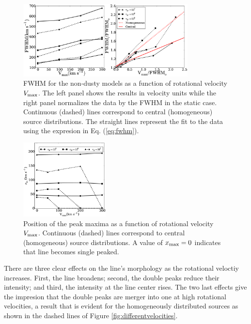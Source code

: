 \documentclass{emulateapj}
\begin{document}
\begin{figure}
\begin{center}
  \includegraphics[width=0.8\textwidth]{f2.eps}
\end{center}
  \caption{FWHM for the non-dusty models as a function of
    rotational velocity $V_{\rm max}$. The left panel shows the
    results in velocity units while the right panel normalizes
    the data by the FWHM in the static case. 
    Continuous (dashed) lines  correspond to central (homogeneous)
    source distributions. The straight lines represent the fit to
    the data using the expresion in Eq. (\ref{eq:fwhm}).
    \label{fig:widthvsvelocity}} 
\end{figure}


\begin{figure}
\begin{center}
  \includegraphics[width=0.40\textwidth]{f3.eps}
\end{center}
\caption{Position of the peak maxima as a function of rotational
  velocity $V_{\rm max}$. Continuous (dashed) lines correspond to
  central (homogeneous) source distributions. A value of $x_{\rm
    max}=0$ indicates that line becomes single
  peaked. \label{fig:maximumsvsvelocity}}  
\end{figure}

There are three clear effects on the line's morphology as the
rotational veloctiy increases. First, the line
broadens; second, the double peaks reduce their intensity; and third,
the intensity at the line center rises. The two last effects give the
impresion that the double peaks are merger into one at high rotational
velocities, a result that is evident for the homogeneously distributed
sources as shown in the dashed lines of Figure \ref{fig:differentvelocities}.
\end{document}
